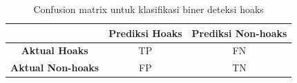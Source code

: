 \begin{table}[h!]
    \centering
    \begin{tabular}{c|c|c}
    \textbf{} & \textbf{Prediksi Hoaks} & \textbf{Prediksi Non-hoaks} \\
    \hline
    \textbf{Aktual Hoaks} & TP & FN \\
    \hline
    \textbf{Aktual Non-hoaks} & FP & TN \\
    \end{tabular}
\caption{Confusion matrix untuk klasifikasi biner deteksi hoaks}
\label{tbl:confusion-matrix}
\end{table}
